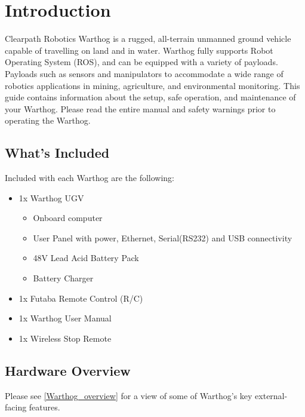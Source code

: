 \documentclass[]{clearpath-latex/clearpath-manual}
\begin{document}
\tableofcontents

\section{Introduction}
Clearpath Robotics Warthog is a rugged, all-terrain unmanned ground vehicle capable of travelling on land and in water.  Warthog fully supports Robot Operating System (ROS), and can be equipped with a variety of payloads. Payloads such as sensors and manipulators to accommodate a wide range of robotics applications in mining, agriculture, and environmental monitoring. This guide contains information about the setup, safe operation, and maintenance of your Warthog.  Please read the entire manual and safety warnings prior to operating the Warthog.

\subsection{What's Included}

Included with each Warthog are the following:

\begin{itemize}[nolistsep]
  \item 1x Warthog UGV
  \begin{itemize}
    \item{Onboard computer}
    \item{User Panel with power, Ethernet, Serial(RS232) and USB connectivity}
    \item{48V Lead Acid Battery Pack}
    \item{Battery Charger}
  \end{itemize}
  \item 1x Futaba Remote Control (R/C)
  \item 1x Warthog User Manual
  \item 1x Wireless Stop Remote
\end{itemize}



\pagebreak[4]
\subsection{Hardware Overview}

Please see \autoref{Warthog_overview} for a view of some of Warthog's key external-facing features.
\end{document}
